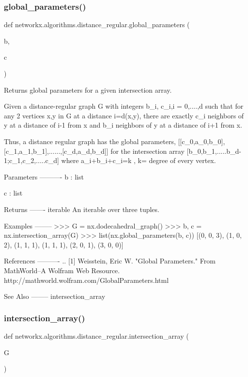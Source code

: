 \subsubsection{\texorpdfstring{global\+\_\+parameters()}{global\_parameters()}}
{\footnotesize\ttfamily def networkx.\+algorithms.\+distance\+\_\+regular.\+global\+\_\+parameters (\begin{DoxyParamCaption}\item[{}]{b,  }\item[{}]{c }\end{DoxyParamCaption})}

\begin{DoxyVerb}Returns global parameters for a given intersection array.

Given a distance-regular graph G with integers b_i, c_i,i = 0,....,d
such that for any 2 vertices x,y in G at a distance i=d(x,y), there
are exactly c_i neighbors of y at a distance of i-1 from x and b_i
neighbors of y at a distance of i+1 from x.

Thus, a distance regular graph has the global parameters,
[[c_0,a_0,b_0],[c_1,a_1,b_1],......,[c_d,a_d,b_d]] for the
intersection array  [b_0,b_1,.....b_{d-1};c_1,c_2,.....c_d]
where a_i+b_i+c_i=k , k= degree of every vertex.

Parameters
----------
b : list

c : list

Returns
-------
iterable
   An iterable over three tuples.

Examples
--------
>>> G = nx.dodecahedral_graph()
>>> b, c = nx.intersection_array(G)
>>> list(nx.global_parameters(b, c))
[(0, 0, 3), (1, 0, 2), (1, 1, 1), (1, 1, 1), (2, 0, 1), (3, 0, 0)]

References
----------
.. [1] Weisstein, Eric W. "Global Parameters."
   From MathWorld--A Wolfram Web Resource.
   http://mathworld.wolfram.com/GlobalParameters.html

See Also
--------
intersection_array
\end{DoxyVerb}
 \mbox{\label{namespacenetworkx_1_1algorithms_1_1distance__regular_a4e5e4115a9ad6a681119c7ac1a2941d4}} 
\subsubsection{\texorpdfstring{intersection\+\_\+array()}{intersection\_array()}}
{\footnotesize\ttfamily def networkx.\+algorithms.\+distance\+\_\+regular.\+intersection\+\_\+array (\begin{DoxyParamCaption}\item[{}]{G }\end{DoxyParamCaption})}

